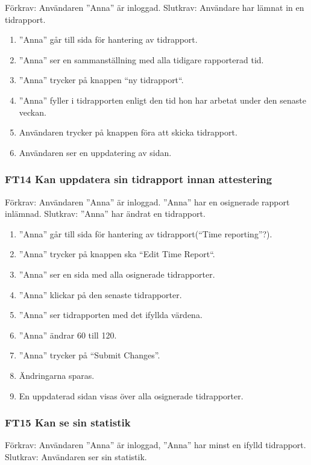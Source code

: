 \documentclass[paper=a4, fontsize=11pt,twoside]{article}
\begin{document}
		Förkrav: Användaren ”Anna” är inloggad.
		\newline 
		Slutkrav: Användare har lämnat in en tidrapport.
		
		\begin{enumerate}
		  \item ”Anna” går till sida för hantering av tidrapport.
			\item ”Anna” ser en sammanställning med alla tidigare rapporterad tid.
			\item ”Anna” trycker på knappen “ny tidrapport“.
			\item ”Anna” fyller i tidrapporten enligt den tid hon har arbetat under den
			senaste veckan.
			\item Användaren trycker på knappen föra att skicka
			tidrapport.
			\item Användaren ser en uppdatering av sidan.
		  
		\end{enumerate}
		
		\subsubsection*{FT14 Kan uppdatera sin tidrapport innan attestering}
		
		Förkrav: Användaren ”Anna” är inloggad. ”Anna” har en osignerade rapport inlämnad. 
		\newline
		Slutkrav: ”Anna” har ändrat en tidrapport.
		
		\begin{enumerate}
		 \item ”Anna” går till sida för hantering av tidrapport(“Time reporting”?).
			\item ”Anna” trycker på knappen ska “Edit Time Report“.
			\item ”Anna” ser en sida med alla osignerade tidrapporter.
			\item ”Anna” klickar på den senaste tidrapporter.
			\item ”Anna” ser tidrapporten med det ifyllda värdena.
			\item ”Anna” ändrar 60 till 120.
			\item ”Anna” trycker på “Submit Changes”.
			\item Ändringarna sparas.
			\item En uppdaterad sidan visas över alla osignerade tidrapporter.
		  
		\end{enumerate}
		
		\subsubsection*{FT15 Kan se sin statistik}
		Förkrav: Användaren ”Anna” är inloggad, ”Anna” har minst en ifylld tidrapport.
		\newline
		Slutkrav: Användaren ser sin statistik.
		
\end{document}
